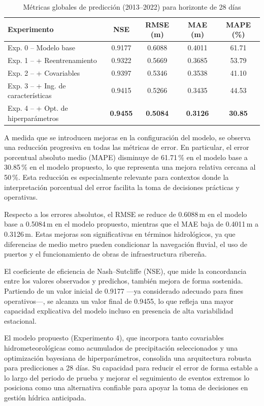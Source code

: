 \begin{table}[H]
\centering
\caption{Métricas globales de predicción (2013–2022) para horizonte de 28 días}
\label{tab:metricas_globales_h28}
\begin{tabular}{p{4.8cm}cccc}
\toprule
\textbf{Experimento} & \textbf{NSE} & \textbf{RMSE (m)} & \textbf{MAE (m)} & \textbf{MAPE (\%)} \\
\midrule
Exp. 0 – Modelo base & 0.9177 & 0.6088 & 0.4011 & 61.71 \\
Exp. 1 – + Reentrenamiento & 0.9322 & 0.5669 & 0.3685 & 53.79 \\
Exp. 2 – + Covariables & 0.9397 & 0.5346 & 0.3538 & 41.10 \\
Exp. 3 – + Ing. de características & 0.9415 & 0.5266 & 0.3435 & 44.53 \\
Exp. 4 – + Opt. de hiperparámetros & \textbf{0.9455} & \textbf{0.5084} & \textbf{0.3126} & \textbf{30.85} \\
\bottomrule
\end{tabular}
\end{table}

A medida que se introducen mejoras en la configuración del modelo, se observa una reducción progresiva en todas las métricas de error. En particular, el error porcentual absoluto medio (MAPE) disminuye de 61.71\,\% en el modelo base a 30.85\,\% en el modelo propuesto, lo que representa una mejora relativa cercana al 50\,\%. Esta reducción es especialmente relevante para contextos donde la interpretación porcentual del error facilita la toma de decisiones prácticas y operativas.

Respecto a los errores absolutos, el RMSE se reduce de 0.6088\,m en el modelo base a 0.5084\,m en el modelo propuesto, mientras que el MAE baja de 0.4011\,m a 0.3126\,m. Estas mejoras son significativas en términos hidrológicos, ya que diferencias de medio metro pueden condicionar la navegación fluvial, el uso de puertos y el funcionamiento de obras de infraestructura ribereña.

El coeficiente de eficiencia de Nash–Sutcliffe (NSE), que mide la concordancia entre los valores observados y predichos, también mejora de forma sostenida. Partiendo de un valor inicial de 0.9177 —ya considerado adecuado para fines operativos—, se alcanza un valor final de 0.9455, lo que refleja una mayor capacidad explicativa del modelo incluso en presencia de alta variabilidad estacional.

El modelo propuesto (Experimento 4), que incorpora tanto covariables hidrometeorológicas como acumulados de precipitación seleccionados y una optimización bayesiana de hiperparámetros, consolida una arquitectura robusta para predicciones a 28 días. Su capacidad para reducir el error de forma estable a lo largo del periodo de prueba y mejorar el seguimiento de eventos extremos lo posiciona como una alternativa confiable para apoyar la toma de decisiones en gestión hídrica anticipada.



